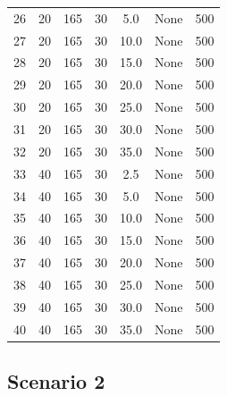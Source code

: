 \documentclass[
]{article}
\begin{document}
\begin{table}[H]
\begin{tabular}{ccccccc}
26 & 20 & 165 & 30 & 5.0 & None & 500\\
\rowcolor{gray!6}  27 & 20 & 165 & 30 & 10.0 & None & 500\\
28 & 20 & 165 & 30 & 15.0 & None & 500\\
\rowcolor{gray!6}  29 & 20 & 165 & 30 & 20.0 & None & 500\\
30 & 20 & 165 & 30 & 25.0 & None & 500\\
\rowcolor{gray!6}  31 & 20 & 165 & 30 & 30.0 & None & 500\\
32 & 20 & 165 & 30 & 35.0 & None & 500\\
\rowcolor{gray!6}  33 & 40 & 165 & 30 & 2.5 & None & 500\\
34 & 40 & 165 & 30 & 5.0 & None & 500\\
\rowcolor{gray!6}  35 & 40 & 165 & 30 & 10.0 & None & 500\\
36 & 40 & 165 & 30 & 15.0 & None & 500\\
\rowcolor{gray!6}  37 & 40 & 165 & 30 & 20.0 & None & 500\\
38 & 40 & 165 & 30 & 25.0 & None & 500\\
\rowcolor{gray!6}  39 & 40 & 165 & 30 & 30.0 & None & 500\\
40 & 40 & 165 & 30 & 35.0 & None & 500\\
\bottomrule
\end{tabular}
\endgroup{}
\end{table}

\subsection{Scenario 2}
\end{document}

